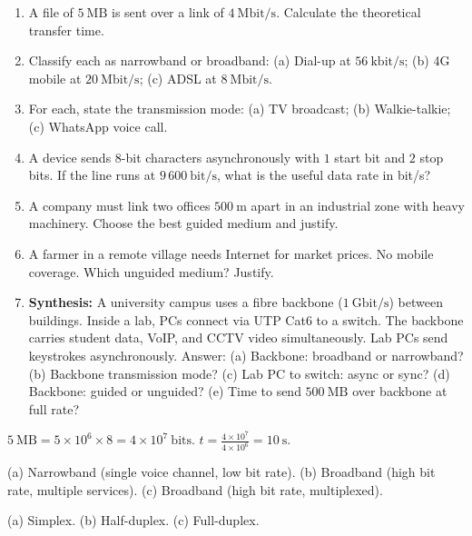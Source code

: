 \documentclass[11pt]{article}
\begin{document}
\begin{exercice}
\begin{enumerate}
\item A file of $5\ \mathrm{MB}$ is sent over a link of $4\ \mathrm{Mbit/s}$. Calculate the theoretical transfer time.
\item Classify each as narrowband or broadband: (a) Dial-up at $56\ \mathrm{kbit/s}$; (b) 4G mobile at $20\ \mathrm{Mbit/s}$; (c) ADSL at $8\ \mathrm{Mbit/s}$.
\item For each, state the transmission mode: (a) TV broadcast; (b) Walkie-talkie; (c) WhatsApp voice call.
\item A device sends $8$-bit characters asynchronously with $1$ start bit and $2$ stop bits. If the line runs at $9\,600\ \mathrm{bit/s}$, what is the useful data rate in bit/s?
\item A company must link two offices $500\ \mathrm{m}$ apart in an industrial zone with heavy machinery. Choose the best guided medium and justify.
\item A farmer in a remote village needs Internet for market prices. No mobile coverage. Which unguided medium? Justify.
\item \textbf{Synthesis:} A university campus uses a fibre backbone ($1\ \mathrm{Gbit/s}$) between buildings. Inside a lab, PCs connect via UTP Cat6 to a switch. The backbone carries student data, VoIP, and CCTV video simultaneously. Lab PCs send keystrokes asynchronously. Answer: (a) Backbone: broadband or narrowband? (b) Backbone transmission mode? (c) Lab PC to switch: async or sync? (d) Backbone: guided or unguided? (e) Time to send $500\ \mathrm{MB}$ over backbone at full rate?
\end{enumerate}
\end{exercice}

\begin{corrige}[Exercise 1]
$5\ \mathrm{MB} = 5 \times 10^6 \times 8 = 4 \times 10^7\ \mathrm{bits}$. $t = \frac{4 \times 10^7}{4 \times 10^6} = 10\ \mathrm{s}$.
\end{corrige}

\begin{corrige}[Exercise 2]
(a) Narrowband (single voice channel, low bit rate). (b) Broadband (high bit rate, multiple services). (c) Broadband (high bit rate, multiplexed).
\end{corrige}

\begin{corrige}[Exercise 3]
(a) Simplex. (b) Half-duplex. (c) Full-duplex.
\end{corrige}
\end{document}
